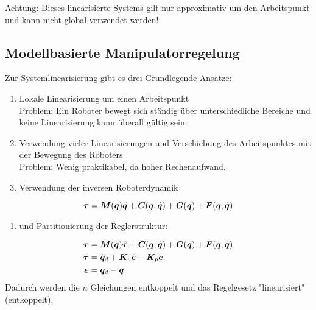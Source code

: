 			Achtung: Dieses linearisierte Systems gilt nur approximativ um den Arbeitspunkt und kann nicht global verwendet werden!

		\subsection{Modellbasierte Manipulatorregelung}
			Zur Systemlinearisierung gibt es drei Grundlegende Ansätze:
			\begin{enumerate}
				\item Lokale Linearisierung um einen Arbeitspunkt \\ Problem: Ein Roboter bewegt sich ständig über unterschiedliche Bereiche und keine Linearisierung kann überall gültig sein.
				\item Verwendung vieler Linearisierungen und Verschiebung des Arbeitspunktes mit der Bewegung des Roboters \\ Problem: Wenig praktikabel, da hoher Rechenaufwand.
				\item Verwendung der inversen Roboterdynamik
			\end{enumerate}
			\begin{equation*}
				\bm{\tau} = \bm{M}(\bm{q}) \ddot{\bm{q}} + \bm{C}(\bm{q}, \dot{\bm{q}}) + \bm{G}(\bm{q}) + \bm{F}(\bm{q}, \dot{\bm{q}})
			\end{equation*}
			\begin{enumerate}
				\item[] und Partitionierung der Reglerstruktur:
			\end{enumerate}
			\vspace{-0.5cm}
			\begin{align*}
				\bm{\tau}       & = \bm{M}(\bm{q})\hat{\bm{\tau}} + \bm{C}(\bm{q}, \dot{\bm{q}}) + \bm{G}(\bm{q}) + \bm{F}(\bm{q}, \dot{\bm{q}}) \\
				\hat{\bm{\tau}} & = \ddot{\bm{q}}_d + \bm{K}_v \dot{\bm{e}} + \bm{K}_p \bm{e}                                                          \\
				\bm{e}          & = \bm{q}_d - \bm{q}
			\end{align*}
			Dadurch werden die \(n\) Gleichungen entkoppelt und das Regelgesetz "linearisiert" (entkoppelt).

